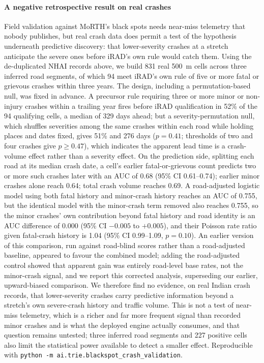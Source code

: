 \documentclass[journal]{IEEEtran}
\begin{document}
\paragraph{A negative retrospective result on real crashes} Field validation against MoRTH's black spots needs near-miss telemetry that nobody publishes, but real crash data does permit a test of the hypothesis underneath predictive discovery: that lower-severity crashes at a stretch anticipate the severe ones before iRAD's own rule would catch them. Using the de-duplicated NHAI records above, we build 831 real 500~m cells across three inferred road segments, of which 94 meet iRAD's own rule of five or more fatal or grievous crashes within three years. The design, including a permutation-based null, was fixed in advance. A precursor rule requiring three or more minor or non-injury crashes within a trailing year fires before iRAD qualification in 52\% of the 94 qualifying cells, a median of 329 days ahead; but a severity-permutation null, which shuffles severities among the same crashes within each road while holding places and dates fixed, gives 51\% and 276 days ($p=0.41$; thresholds of two and four crashes give $p\geq0.47$), which indicates the apparent lead time is a crash-volume effect rather than a severity effect. On the prediction side, splitting each road at its median crash date, a cell's earlier fatal-or-grievous count predicts two or more such crashes later with an AUC of 0.68 (95\% CI 0.61--0.74); earlier minor crashes alone reach 0.64; total crash volume reaches 0.69. A road-adjusted logistic model using both fatal history and minor-crash history reaches an AUC of 0.755, but the identical model with the minor-crash term removed also reaches 0.755, so the minor crashes' own contribution beyond fatal history and road identity is an AUC difference of 0.000 (95\% CI $-0.005$ to $+0.005$), and their Poisson rate ratio given fatal-crash history is 1.04 (95\% CI 0.99--1.09, $p=0.10$). An earlier version of this comparison, run against road-blind scores rather than a road-adjusted baseline, appeared to favour the combined model; adding the road-adjusted control showed that apparent gain was entirely road-level base rates, not the minor-crash signal, and we report this corrected analysis, superseding our earlier, upward-biased comparison. We therefore find no evidence, on real Indian crash records, that lower-severity crashes carry predictive information beyond a stretch's own severe-crash history and traffic volume. This is not a test of near-miss telemetry, which is a richer and far more frequent signal than recorded minor crashes and is what the deployed engine actually consumes, and that question remains untested; three inferred road segments and 227 positive cells also limit the statistical power available to detect a smaller effect. Reproducible with \texttt{python -m ai.trie.blackspot\_crash\_validation}.
\end{document}
